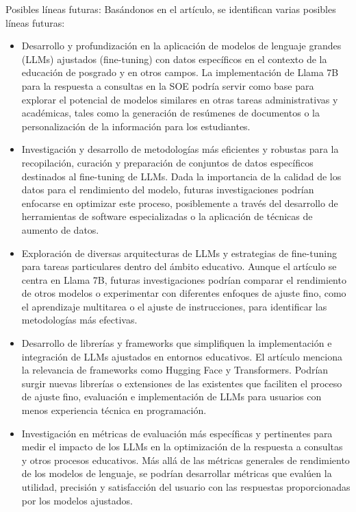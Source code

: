 \documentclass[12pt,twocolumn]{article}
\begin{document}
Posibles líneas futuras:
Basándonos en el artículo, se identifican varias posibles líneas futuras:
\begin{itemize}
    \item Desarrollo y profundización en la aplicación de modelos de lenguaje grandes (LLMs) ajustados (fine-tuning) con datos específicos en el contexto de la educación de posgrado y en otros campos. 
    La implementación de Llama 7B para la respuesta a consultas en la SOE podría servir como base para explorar el potencial de modelos similares en otras tareas administrativas y académicas, tales como la generación de resúmenes de documentos o la personalización de la información para los estudiantes.
    \item Investigación y desarrollo de metodologías más eficientes y robustas para la recopilación, curación y preparación de conjuntos de datos específicos destinados al fine-tuning de LLMs. 
    Dada la importancia de la calidad de los datos para el rendimiento del modelo, futuras investigaciones podrían enfocarse en optimizar este proceso, posiblemente a través del desarrollo de herramientas de software especializadas o la aplicación de técnicas de aumento de datos.
    \item Exploración de diversas arquitecturas de LLMs y estrategias de fine-tuning para tareas particulares dentro del ámbito educativo. 
    Aunque el artículo se centra en Llama 7B, futuras investigaciones podrían comparar el rendimiento de otros modelos o experimentar con diferentes enfoques de ajuste fino, como el aprendizaje multitarea o el ajuste de instrucciones, para identificar las metodologías más efectivas.
    \item Desarrollo de librerías y frameworks que simplifiquen la implementación e integración de LLMs ajustados en entornos educativos. 
    El artículo menciona la relevancia de frameworks como Hugging Face y Transformers. 
    Podrían surgir nuevas librerías o extensiones de las existentes que faciliten el proceso de ajuste fino, evaluación e implementación de LLMs para usuarios con menos experiencia técnica en programación.
    \item Investigación en métricas de evaluación más específicas y pertinentes para medir el impacto de los LLMs en la optimización de la respuesta a consultas y otros procesos educativos. 
    Más allá de las métricas generales de rendimiento de los modelos de lenguaje, se podrían desarrollar métricas que evalúen la utilidad, precisión y satisfacción del usuario con las respuestas proporcionadas por los modelos ajustados.
\end{itemize}
\end{document}
